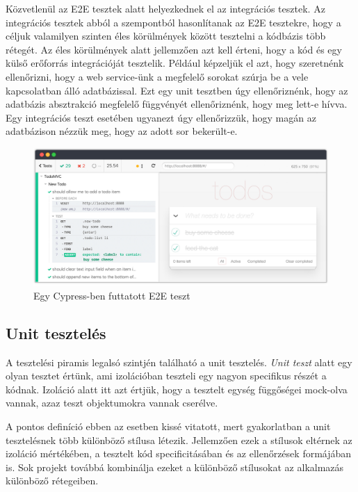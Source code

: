 Közvetlenül az E2E tesztek alatt helyezkednek el az integrációs tesztek. Az integrációs tesztek abból a szempontból hasonlítanak az E2E tesztekre, hogy a céljuk valamilyen szinten éles körülmények között tesztelni a kódbázis több rétegét. Az éles körülmények alatt jellemzően azt kell érteni, hogy a kód és egy külső erőforrás integrációját tesztelik.
Például képzeljük el azt, hogy szeretnénk ellenőrizni, hogy a web service-ünk a megfelelő sorokat szúrja be a vele kapcsolatban álló adatbázissal. Ezt egy unit tesztben úgy ellenőriznénk, hogy az adatbázis absztrakció megfelelő függvényét ellenőriznénk, hogy meg lett-e hívva. Egy integrációs teszt esetében ugyanezt úgy ellenőrizzük, hogy magán az adatbázison nézzük meg, hogy az adott sor bekerült-e.

\begin{figure}[H]
    \centering
    \includegraphics[width=1\textwidth]{images/cypress.png}
    \caption{Egy Cypress-ben futtatott E2E teszt}
    \label{fig:cypress-example}
\end{figure}

\subsection{Unit tesztelés}

A tesztelési piramis legalsó szintjén található a unit tesztelés. \textit{Unit teszt} alatt egy olyan tesztet értünk, ami izolációban teszteli egy nagyon specifikus részét a kódnak. Izoláció alatt itt azt értjük, hogy a tesztelt egység függőségei mock-olva vannak, azaz teszt objektumokra vannak cserélve.

A pontos definíció ebben az esetben kissé vitatott, mert gyakorlatban a unit tesztelésnek több különböző stílusa létezik. Jellemzően ezek a stílusok eltérnek az izoláció mértékében, a tesztelt kód specificitásában és az ellenőrzések formájában is. Sok projekt továbbá kombinálja ezeket a különböző stílusokat az alkalmazás különböző rétegeiben.

